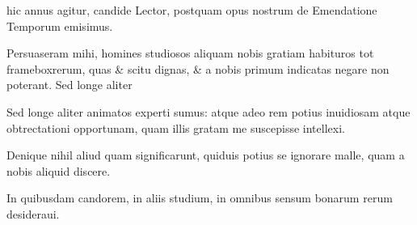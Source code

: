 \begin{parnumbers}
 hic annus agitur, candide Lector, postquam opus nostrum de Emendatione Temporum emisimus.

Persuaseram mihi, homines studiosos aliquam nobis gratiam habituros tot framebox{rerum, quas \& scitu dignas,} \& a nobis primum indicatas negare non poterant. Sed longe aliter

Sed longe aliter animatos experti sumus: atque adeo rem potius inuidiosam atque obtrectationi opportunam, quam illis gratam me suscepisse intellexi.

Denique nihil aliud quam significarunt, quiduis potius se ignorare malle, quam a nobis aliquid discere.

In quibusdam candorem, in aliis studium, in omnibus sensum bonarum rerum desideraui.

\end{parnumbers}
